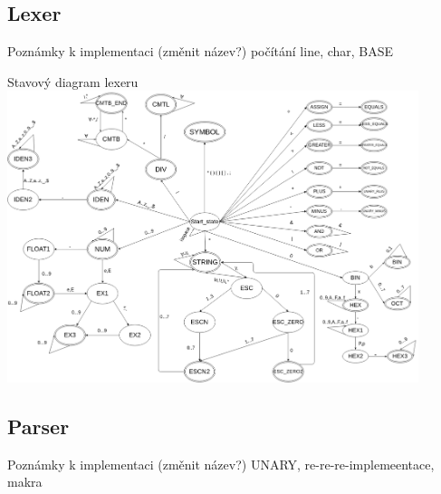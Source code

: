 \documentclass[13pt]{beamer}
\begin{document}
\subsection{Lexer}

\begin{frame}{Poznámky k implementaci (změnit název?)}
počítání line, char, BASE
\end{frame}

\begin{frame}{Stavový diagram lexeru}
\includegraphics[width=0.9\textwidth]{./img/lex1.pdf}

\end{frame}

\subsection{Parser}

\begin{frame}{Poznámky k implementaci (změnit název?)}
UNARY, re-re-re-implemeentace, makra
\end{frame}
\end{document}
